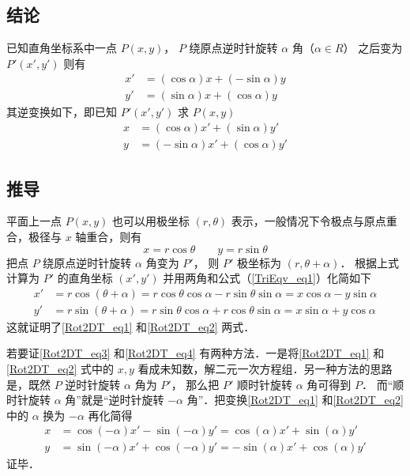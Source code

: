 
\subsection{结论}
已知直角坐标系中一点 $P(x,y)$， $P$ 绕原点逆时针旋转 $\alpha $ 角（$\alpha  \in R$） 之后变为 $P'(x',y')$ 则有
\begin{align}\label{Rot2DT_eq1}
x' &= (\cos \alpha)x + (- \sin \alpha)y \\
\label{Rot2DT_eq2}
y' &= (\sin \alpha)x + (\cos \alpha)y
\end{align}
其逆变换如下，即已知 $P'(x',y')$ 求 $P(x,y)$ 
\begin{align}\label{Rot2DT_eq3}
x &= ( \cos \alpha  )x' + ( \sin \alpha  )y' \\
\label{Rot2DT_eq4}
y &= ( - \sin \alpha  )x' + ( \cos \alpha )y'
\end{align}

\subsection{推导}

平面上一点 $P(x,y)$ 也可以用极坐标 $(r, \theta)$ 表示，一般情况下令极点与原点重合，极径与 $x$ 轴重合，则有
\begin{equation}
x = r\cos \theta \qquad y = r\sin \theta 
\end{equation}     
把点 $P$ 绕原点逆时针旋转 $\alpha $ 角变为 $P'$， 则 $P'$ 极坐标为 $(r, \theta  + \alpha)$． 根据上式计算为 $P'$ 的直角坐标 $(x', y')$ 并用两角和公式（\autoref{TriEqv_eq1}）化简如下
\begin{align}
x' &= r\cos(\theta  + \alpha) = r\cos\theta \cos\alpha  - r\sin\theta \sin\alpha  = x\cos\alpha  - y\sin\alpha \\
y' &= r\sin(\theta  + \alpha) = r\sin\theta \cos\alpha  + r\cos\theta \sin\alpha  = x\sin\alpha  + y\cos\alpha 
\end{align} 
这就证明了\autoref{Rot2DT_eq1} 和\autoref{Rot2DT_eq2} 两式．

若要证\autoref{Rot2DT_eq3} 和\autoref{Rot2DT_eq4} 有两种方法．一是将\autoref{Rot2DT_eq1} 和\autoref{Rot2DT_eq2} 式中的 $x, y$ 看成未知数，解二元一次方程组．另一种方法的思路是，既然 $P$ 逆时针旋转 $\alpha $ 角为 $P'$， 那么把 $P'$ 顺时针旋转 $\alpha$ 角可得到 $P$． 而“顺时针旋转 $\alpha$ 角”就是“逆时针旋转 $-\alpha $ 角”．把变换\autoref{Rot2DT_eq1} 和\autoref{Rot2DT_eq2} 中的 $\alpha$ 换为 $-\alpha$ 再化简得
 \begin{align}
x &= \cos(-\alpha) x' - \sin(-\alpha) y' = \cos(\alpha) x' + \sin(\alpha) y'\\
y &= \sin(-\alpha) x' + \cos(-\alpha) y' =  -\sin(\alpha) x' + \cos(\alpha) y'
\end{align}
证毕．
